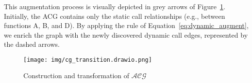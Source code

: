 \documentclass[acmsmall,screen,review,anonymous]{acmart} %
\begin{document}
This augmentation process is visually depicted in grey arrows of Figure~\ref{fig:acg_transform}. Initially, the ACG contains only the static call relationships (e.g., between functions A, B, and D). By applying the rule of Equation~\ref{eq:dynamic_augment}, we enrich the graph with the newly discovered dynamic call edges, represented by the dashed arrows.

\begin{figure}[h] %
    \centering
    \texttt{[image: img/cg\_transition.drawio.png]} %
    \caption{Construction and transformation of $\mathcal{ACG}$} %
    \label{fig:acg_transform} %
\end{figure}





\end{document}
